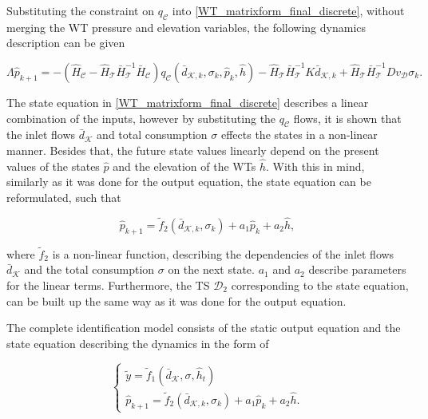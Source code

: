 Substituting the constraint on $q_{\mathcal{C}}$ into \eqref{WT_matrixform_final_discrete}, without merging the WT pressure and elevation variables, the following dynamics description can be given

\begin{equation}
\label{WT_matrixform_final_discrete1}
\Lambda \hat{p}_{k+1} = - (\hat{H}_{\mathcal{C}} - \hat{H}_{\mathcal{T}} \bar{H}^{-1}_{\mathcal{T}}\bar{H}_{\mathcal{C}})  q_\mathcal{C}(\bar{d}_{\mathcal{K},k}, \sigma_k, \hat{p}_k, \hat{h})  - \hat{H}_{\mathcal{T}} \bar{H}^{-1}_{\mathcal{T}} K \bar{d}_{\mathcal{K},k} + \hat{H}_{\mathcal{T}} \bar{H}^{-1}_{\mathcal{T}} D v_{\mathcal{D}} \sigma_k.
\end{equation}

The state equation in \eqref{WT_matrixform_final_discrete} describes a linear combination of the inputs, however by substituting the $q_\mathcal{C}$ flows, it is shown that the inlet flows $\bar{d}_{\mathcal{K}}$ and total consumption $\sigma$ effects the states in a non-linear manner. Besides that, the future state values linearly depend on the present values of the states $\hat{p}$ and the elevation of the WTs $\hat{h}$. With this in mind, similarly as it was done for the output equation, the state equation can be reformulated, such that 

\begin{equation}
\label{WT_matrixform_final_discrete2}
\hat{p}_{k+1} = \tilde{f}_2(\bar{d}_{\mathcal{K},k}, \sigma_k) + a_1 \hat{p}_k + a_2 \hat{h},
\end{equation}

where $\tilde{f}_2$ is a non-linear function, describing the dependencies of the inlet flows $\bar{d}_{\mathcal{K}}$ and the total consumption $\sigma$ on the next state. $a_1$ and $a_2$ describe parameters for the linear terms. Furthermore, the TS $\mathcal{D}_2$ corresponding to the state equation, can be built up the same way as it was done for the output equation. 

The complete identification model consists of the static output equation and the state equation describing the dynamics in the form of

\begin{equation}
\begin{cases}
  \label{identification_model}
    \tilde{y}  = \tilde{f}_1(\bar{d}_{\mathcal{K}}, \sigma, \hat{h}_t )\\
  \hat{p}_{k+1} = \tilde{f}_2(\bar{d}_{\mathcal{K},k}, \sigma_k) + a_1 \hat{p}_k + a_2 \hat{h} .
  \end{cases}
\end{equation} 

